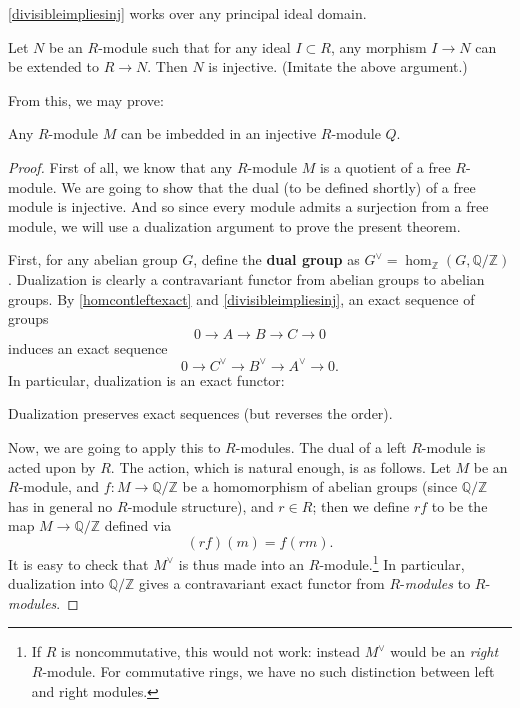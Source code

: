 \begin{exercise} 
\cref{divisibleimpliesinj} works over any principal ideal domain.
\end{exercise} 
\begin{exercise}[Baer] \label{baercriterion}
Let $N$ be an $R$-module such that for any ideal $I \subset R$, any morphism
$I \to N$ can be extended to $R \to N$. Then $N$ is injective. (Imitate the
above argument.)
\end{exercise} 

From this, we may prove:
\begin{theorem}
Any $R$-module $M$ can be imbedded in an injective $R$-module $Q$.
\end{theorem}
\begin{proof} 
First of all, we know that any $R$-module $M$ is a quotient of a free
$R$-module.  We are going to show that the {dual} (to be defined shortly) of a free module is injective.  And so since
every module admits a surjection from a free module, we will use a  dualization
argument to prove the present theorem.

First, for any abelian group $G$, define the \textbf{dual group} as $G^\vee
= \hom_{\mathbb{Z}}(G, \mathbb{Q}/\mathbb{Z})$.
Dualization is clearly a contravariant functor from abelian groups to abelian
groups.
By \cref{homcontleftexact}
and \cref{divisibleimpliesinj}, an exact
sequence of groups
\[ 0 \to A \to B \to C \to 0 \]
induces an exact sequence
\[ 0 \to C^\vee \to B^\vee \to A^\vee \to 0 .\]
In particular, dualization is an exact functor:

\begin{proposition} Dualization preserves exact sequences (but reverses
the order).
\end{proposition}

Now, we are going to apply this to $R$-modules.  The dual of  a left $R$-module
is acted upon by $R$.
The action, which is natural enough, is as follows.  Let $M$ be an
$R$-module, and  $f: M \to
\mathbb{Q}/\mathbb{Z}$ be a homomorphism of abelian groups (since 
$\mathbb{Q}/\mathbb{Z}$ has in general no $R$-module structure), and $r \in
R$; then we define $rf$ to be the map $M \to \mathbb{Q}/\mathbb{Z}$ defined via
\[ (rf)(m) = f(rm).\]
It is easy to check that $M^{\vee}$ is thus made into an
$R$-module.\footnote{If $R$ is noncommutative, this would not work: instead
$M^{\vee}$ would be an \emph{right} $R$-module. For commutative rings, we have
no such distinction between left and right modules.}
In particular, dualization into $\mathbb{Q}/\mathbb{Z}$ gives a contravariant
exact functor from $R$-\emph{modules} to $R$-\emph{modules}.



\end{proof}
